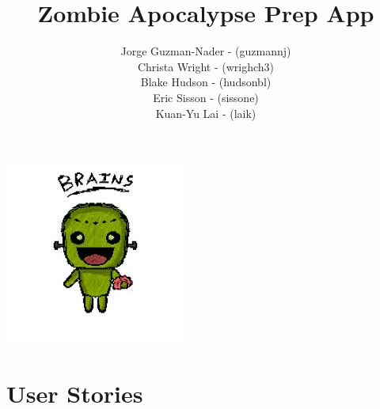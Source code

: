 \documentclass[a4paper]{article}
\title{Zombie Apocalypse Prep App  }
\author{Jorge Guzman-Nader - (guzmannj)\\ Christa Wright - (wrighch3)\\ Blake Hudson - (hudsonbl)\\ Eric Sisson -  (sissone)\\ Kuan-Yu Lai - (laik)}
\begin{document}
\maketitle
\includegraphics[width=\textwidth]{index.jpg}
\pagebreak
\tableofcontents
\pagebreak
\section{User Stories}
\end{document}
